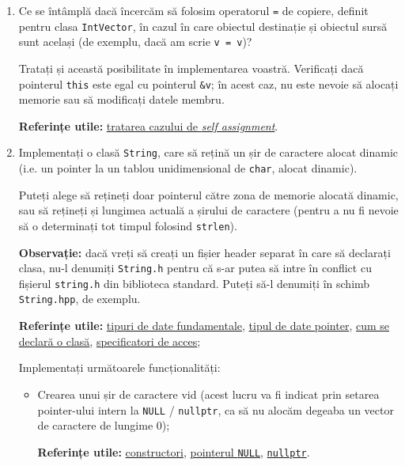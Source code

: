\begin{enumerate}
    \item Ce se întâmplă dacă încercăm să folosim operatorul \texttt{=} de copiere, definit pentru clasa \texttt{IntVector}, în cazul în care obiectul destinație și obiectul sursă sunt același (de exemplu, dacă am scrie \texttt{v = v})?
    
    Tratați și această posibilitate în implementarea voastră. Verificați dacă pointerul \texttt{this} este egal cu pointerul \texttt{\&v}; în acest caz, nu este nevoie să alocați memorie sau să modificați datele membru.

    \textbf{Referințe utile:} \href{https://www.geeksforgeeks.org/g-fact-38/}{tratarea cazului de \emph{self assignment}}.

    \item Implementați o clasă \texttt{String}, care să rețină un șir de caractere alocat dinamic (i.e. un pointer la un tablou unidimensional de \texttt{char}, alocat dinamic).

    Puteți alege să rețineți doar pointerul către zona de memorie alocată dinamic, sau să rețineți și lungimea actuală a șirului de caractere (pentru a nu fi nevoie să o determinați tot timpul folosind \texttt{strlen}).

    \textbf{Observație:} dacă vreți să creați un fișier header separat în care să declarați clasa, nu-l denumiți \texttt{String.h} pentru că s-ar putea să intre în conflict cu fișierul \texttt{string.h} din biblioteca standard. Puteți să-l denumiți în schimb \texttt{String.hpp}, de exemplu.
    
    \textbf{Referințe utile:} \href{https://en.cppreference.com/w/cpp/language/types}{tipuri de date fundamentale}, \href{https://en.cppreference.com/w/cpp/language/pointer}{tipul de date pointer}, \href{https://en.cppreference.com/w/cpp/language/class}{cum se declară o clasă}, \href{https://en.cppreference.com/w/cpp/language/access}{specificatori de acces};

    Implementați următoarele funcționalități:
    \begin{itemize}
        \item Crearea unui șir de caractere vid (acest lucru va fi indicat prin setarea pointer-ului intern la \texttt{NULL} / \texttt{nullptr}, ca să nu alocăm degeaba un vector de caractere de lungime 0);
        
        \textbf{Referințe utile:} \href{https://en.cppreference.com/w/cpp/language/constructor}{constructori}, \href{https://en.cppreference.com/w/cpp/types/NULL}{pointerul \texttt{NULL}}, \href{https://en.cppreference.com/w/cpp/language/nullptr}{\texttt{nullptr}}.


\end{itemize}
\end{enumerate}
